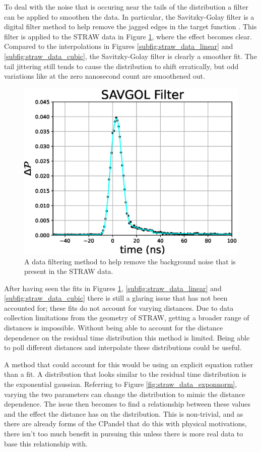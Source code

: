 To deal with the noise that is occuring near the tails of the distribution a filter can be applied to smoothen the data. In particular, the Savitzky-Golay filter is a digital filter method to help remove the jagged edges in the target function \cite{savgol}. This filter is applied to the STRAW data in Figure \ref{fig:straw_data_savgol}, where the effect becomes clear. Compared to the interpolations in Figures \ref{subfig:straw_data_linear} and \ref{subfig:straw_data_cubic}, the Savitzky-Golay filter is clearly a smoother fit. The tail jittering still tends to cause the distribution to shift erratically, but odd variations like at the zero nanosecond count are smoothened out.

\begin{figure}[H]
  \centering
  \includegraphics[width=12cm]{./Figures/reco_plots/straw_data_fit_savgol.eps}
  \caption{A data filtering method to help remove the background noise that is present in the STRAW data.}
  \label{fig:straw_data_savgol}
\end{figure}

After having seen the fits in Figures \ref{fig:straw_data_savgol}, \ref{subfig:straw_data_linear} and \ref{subfig:straw_data_cubic} there is still a glaring issue that has not been accounted for; these fits do not account for varying distances. Due to data collection limitations from the geometry of STRAW, getting a broader range of distances is impossible. Without being able to account for the distance dependence on the residual time distribution this method is limited. Being able to poll different distances and interpolate these distributions could be useful.

A method that could account for this would be using an explicit equation rather than a fit. A distribution that looks similar to the residual time distribution is the exponential gaussian. Referring to Figure \ref{fig:straw_data_exponnorm}, varying the two parameters can change the distribution to mimic the distance dependence. The issue then becomes to find a relationship between these values and the effect the distance has on the distribution. This is non-trivial, and as there are already forms of the CPandel that do this with physical motivations, there isn't too much benefit in pursuing this unless there is more real data to base this relationship with. 

